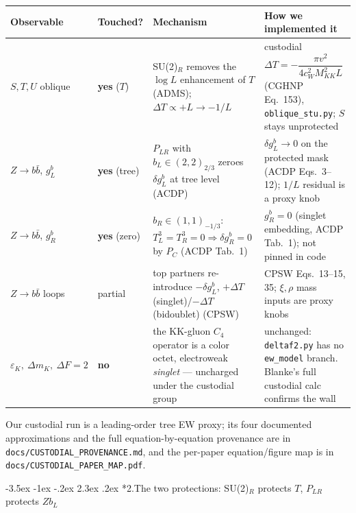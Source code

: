 \documentclass[11pt]{article}
\makeatletter
\renewcommand\section{\@startsection{section}{1}{\z@}%
  {-3.5ex \@plus -1ex \@minus -.2ex}%
  {2.3ex \@plus.2ex}%
  {\normalfont\Large\bfseries\color{accent}}}
\makeatother
\begin{document}
\begin{center}
\small
\renewcommand{\arraystretch}{1.35}
\setlength{\tabcolsep}{5pt}
\begin{tabular}{@{}>{\raggedright\arraybackslash}p{}>{\raggedright\arraybackslash}p{}>{\raggedright\arraybackslash}p{}>{\raggedright\arraybackslash}p{}@{}}
\toprule
\textbf{Observable} & \textbf{Touched?} & \textbf{Mechanism} & \textbf{How we implemented it} \\
\midrule
$S,T,U$ oblique & \textbf{yes} ($T$) &
SU(2)$_R$ removes the $\log L$ enhancement of $T$ (ADMS); $\Delta T\propto+L\to-1/L$ &
custodial $\Delta T=-\dfrac{\pi v^2}{4c_W^2 M_{KK}^2 L}$ (CGHNP Eq.~153), \texttt{oblique\_stu.py}; $S$ stays unprotected \\
$Z\to b\bar b$, $g_L^b$ & \textbf{yes} (tree) &
$P_{LR}$ with $b_L\in(2,2)_{2/3}$ zeroes $\delta g_L^b$ at tree level (ACDP) &
$\delta g_L^b\to0$ on the protected mask (ACDP Eqs.~3--12); $1/L$ residual is a proxy knob \\
$Z\to b\bar b$, $g_R^b$ & \textbf{yes} (zero) &
$b_R\in(1,1)_{-1/3}$: $T^3_L=T^3_R=0\Rightarrow\delta g_R^b=0$ by $P_C$ (ACDP Tab.~1) &
$g_R^b=0$ (singlet embedding, ACDP Tab.~1); not pinned in code \\
$Z\to b\bar b$ loops & partial &
top partners re-introduce $-\delta g_L^b$, $+\Delta T$(singlet)/$-\Delta T$(bidoublet) (CPSW) &
CPSW Eqs.~13--15, 35; $\xi,\rho$ mass inputs are proxy knobs \\
$\varepsilon_K,\ \Delta m_K,\ \Delta F{=}2$ & \textbf{no} &
the KK-gluon $C_4$ operator is a color octet, electroweak \emph{singlet} --- uncharged under the custodial group &
unchanged: \texttt{deltaf2.py} has no \texttt{ew\_model} branch. Blanke's full custodial calc confirms the wall \\
\bottomrule
\end{tabular}
\end{center}

Our custodial run is a leading-order tree EW proxy; its four documented
approximations and the full equation-by-equation provenance are in
\texttt{docs/CUSTODIAL\_PROVENANCE.md}, and the per-paper equation/figure map is in
\texttt{docs/CUSTODIAL\_PAPER\_MAP.pdf}.

\section*{2.\quad The two protections: SU(2)$_R$ protects $T$, $P_{LR}$ protects $Z b_L$}
\end{document}
